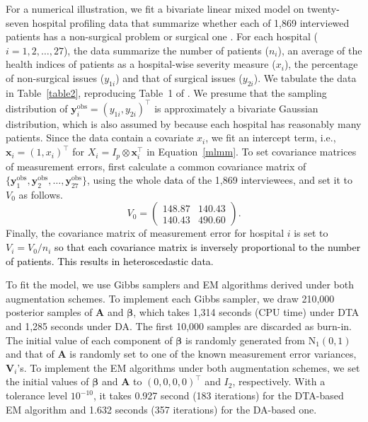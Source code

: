 \documentclass[12pt]{article}
\begin{document}
For a numerical illustration, we fit a bivariate linear mixed model on twenty\textcolor{black}{-}seven hospital profiling data that summarize whether each of 1,869 interviewed patients has a non-surgical problem or surgical one \citep{everson2000inference}. For each hospital ($i=1, 2, \ldots, 27$), the  data summarize the number of patients ($n_i$), an average of the health indices of patients as a hospital-wise severity measure ($x_i$), the percentage of non-surgical issues ($y_{1i}$) and that of surgical issues ($y_{2i}$). We tabulate the data in Table~\ref{table2}, reproducing  Table~1 of \cite{everson2000inference}. We presume that the sampling distribution of $\boldsymbol{y}^{\textrm{obs}}_i=(y_{1i}, y_{2i})^{\top}$ is approximately  a bivariate Gaussian distribution, which is also assumed by \cite{everson2000inference} because each hospital has reasonably  many patients. Since the data contain a covariate $x_i$, we fit an intercept term, i.e., $\boldsymbol{x}_i=(1, x_i)^{\top}$ for $X_i=I_p \otimes \boldsymbol{x}_i^{\top}$ in Equation~\eqref{mlmm}.   To set covariance matrices of measurement errors, \cite{everson2000inference} first calculate a common covariance matrix of $\{\boldsymbol{y}^{\textrm{obs}}_1, \boldsymbol{y}^{\textrm{obs}}_2, \ldots, \boldsymbol{y}^{\textrm{obs}}_{27}\}$, using the whole \textcolor{black}{data} of the 1,869 interviewees, and set it to $V_0$ as follows.
\begin{equation}\nonumber
V_0 = 
\left( \begin{array}{cc}
148.87 & 140.43\\
140.43 & 490.60
\end{array} \right)\!.
\end{equation}
Finally, the covariance matrix of measurement error for hospital $i$ is set to $V_i= V_0/n_i$ \textcolor{black}{so that each covariance matrix is inversely proportional to the number of patients. This results in heteroscedastic data}. %

To fit the model, we use  Gibbs samplers and EM algorithms derived under both augmentation schemes. To implement each Gibbs sampler, we draw 210,000 posterior samples of $\boldsymbol{A}$ and $\boldsymbol{\beta}$, which takes 1,314 seconds (CPU time) under DTA and 1,285 seconds under DA. The first 10,000 samples are discarded as burn-in. The initial value of each component of $\boldsymbol{\beta}$ is randomly generated from $\textrm{N}_1(0, 1)$ and that of $\boldsymbol{A}$ is randomly set to one of the known measurement error variances, $\boldsymbol{V}_i$'s. To implement the EM algorithms under both augmentation schemes, we set the initial values of $\boldsymbol{\beta}$ and $\boldsymbol{A}$ to $(0, 0, 0, 0)^{\top}$ and $I_2$, respectively.  With a tolerance level $10^{-10}$, it takes 0.927 second (183 iterations) for the DTA-based EM algorithm and 1.632 seconds (357 iterations) for the DA-based one.
\end{document}
